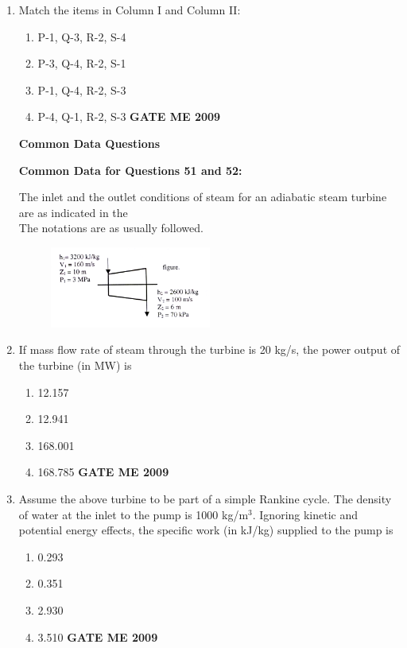 \documentclass[journal]{IEEEtran}
\begin{document}
\begin{enumerate}[leftmargin=0pt]
\item Match the items in Column I and Column II:\\
\begin{table}[h]
    \centering
    
   
\end{table}
\begin{enumerate}[label=(\Alph*)]
  \item P-1, Q-3, R-2, S-4
  \item P-3, Q-4, R-2, S-1
  \item P-1, Q-4, R-2, S-3
  \item P-4, Q-1, R-2, S-3
  \hfill{\textbf{GATE ME 2009}}
\end{enumerate}

\textbf{Common Data Questions}

\textbf{Common Data for Questions 51 and 52:}

The inlet and the outlet conditions of steam for an adiabatic steam turbine are as indicated in the\\
The notations are as usually followed.
\begin{figure}[h]
  \centering
  \includegraphics[width=0.5\textwidth]{Figs/image (11).png}
\end{figure}

\item If mass flow rate of steam through the turbine is 20 kg/s, the power output of the turbine (in MW) is
\begin{enumerate}[label=(\Alph*)]
  \item 12.157
  \item 12.941
  \item 168.001
  \item 168.785
\hfill{\textbf{GATE ME 2009}}
\end{enumerate}

\item Assume the above turbine to be part of a simple Rankine cycle. The density of water at the inlet to the pump is 1000 kg/m$^3$. Ignoring kinetic and potential energy effects, the specific work (in kJ/kg) supplied to the pump is
\begin{enumerate}[label=(\Alph*)]
  \item 0.293
  \item 0.351
  \item 2.930
  \item 3.510
\hfill{\textbf{GATE ME 2009}}
\end{enumerate}


\end{enumerate}
\end{document}
